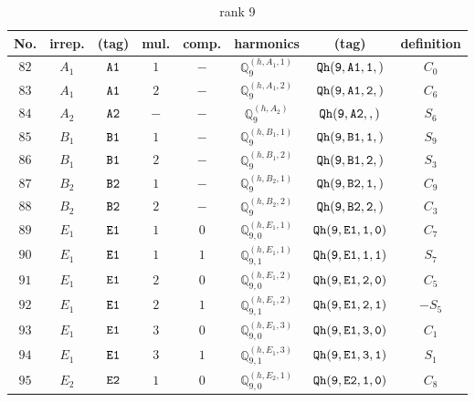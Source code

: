\documentclass[fleqn,8pt]{jsarticle}
\begin{document}
\begin{table}[ht!]
\begin{center}
\caption{rank 9}
\renewcommand{\arraystretch}{1.3}
\begin{tabular}{cccccccc} \hline \hline
No. & irrep. & (tag) & mul. & comp. & harmonics & (tag) & definition \\ \hline
$ 82 $ & $ A_{1} $ & $ {\tt A1} $ & $ 1 $ & $ - $ & $ \mathbb{Q}_{9}^{(h,A_{1},1)} $ & $ {\tt Qh(9,A1,1,)} $ & $ C_{0} $ \\
$ 83 $ & $ A_{1} $ & $ {\tt A1} $ & $ 2 $ & $ - $ & $ \mathbb{Q}_{9}^{(h,A_{1},2)} $ & $ {\tt Qh(9,A1,2,)} $ & $ C_{6} $ \\
$ 84 $ & $ A_{2} $ & $ {\tt A2} $ & $ - $ & $ - $ & $ \mathbb{Q}_{9}^{(h,A_{2})} $ & $ {\tt Qh(9,A2,,)} $ & $ S_{6} $ \\
$ 85 $ & $ B_{1} $ & $ {\tt B1} $ & $ 1 $ & $ - $ & $ \mathbb{Q}_{9}^{(h,B_{1},1)} $ & $ {\tt Qh(9,B1,1,)} $ & $ S_{9} $ \\
$ 86 $ & $ B_{1} $ & $ {\tt B1} $ & $ 2 $ & $ - $ & $ \mathbb{Q}_{9}^{(h,B_{1},2)} $ & $ {\tt Qh(9,B1,2,)} $ & $ S_{3} $ \\
$ 87 $ & $ B_{2} $ & $ {\tt B2} $ & $ 1 $ & $ - $ & $ \mathbb{Q}_{9}^{(h,B_{2},1)} $ & $ {\tt Qh(9,B2,1,)} $ & $ C_{9} $ \\
$ 88 $ & $ B_{2} $ & $ {\tt B2} $ & $ 2 $ & $ - $ & $ \mathbb{Q}_{9}^{(h,B_{2},2)} $ & $ {\tt Qh(9,B2,2,)} $ & $ C_{3} $ \\
$ 89 $ & $ E_{1} $ & $ {\tt E1} $ & $ 1 $ & $ 0 $ & $ \mathbb{Q}_{9,0}^{(h,E_{1},1)} $ & $ {\tt Qh(9,E1,1,0)} $ & $ C_{7} $ \\
$ 90 $ & $ E_{1} $ & $ {\tt E1} $ & $ 1 $ & $ 1 $ & $ \mathbb{Q}_{9,1}^{(h,E_{1},1)} $ & $ {\tt Qh(9,E1,1,1)} $ & $ S_{7} $ \\
$ 91 $ & $ E_{1} $ & $ {\tt E1} $ & $ 2 $ & $ 0 $ & $ \mathbb{Q}_{9,0}^{(h,E_{1},2)} $ & $ {\tt Qh(9,E1,2,0)} $ & $ C_{5} $ \\
$ 92 $ & $ E_{1} $ & $ {\tt E1} $ & $ 2 $ & $ 1 $ & $ \mathbb{Q}_{9,1}^{(h,E_{1},2)} $ & $ {\tt Qh(9,E1,2,1)} $ & $ - S_{5} $ \\
$ 93 $ & $ E_{1} $ & $ {\tt E1} $ & $ 3 $ & $ 0 $ & $ \mathbb{Q}_{9,0}^{(h,E_{1},3)} $ & $ {\tt Qh(9,E1,3,0)} $ & $ C_{1} $ \\
$ 94 $ & $ E_{1} $ & $ {\tt E1} $ & $ 3 $ & $ 1 $ & $ \mathbb{Q}_{9,1}^{(h,E_{1},3)} $ & $ {\tt Qh(9,E1,3,1)} $ & $ S_{1} $ \\
$ 95 $ & $ E_{2} $ & $ {\tt E2} $ & $ 1 $ & $ 0 $ & $ \mathbb{Q}_{9,0}^{(h,E_{2},1)} $ & $ {\tt Qh(9,E2,1,0)} $ & $ C_{8} $ \\

\end{tabular}
\end{center}
\end{table}
\end{document}
